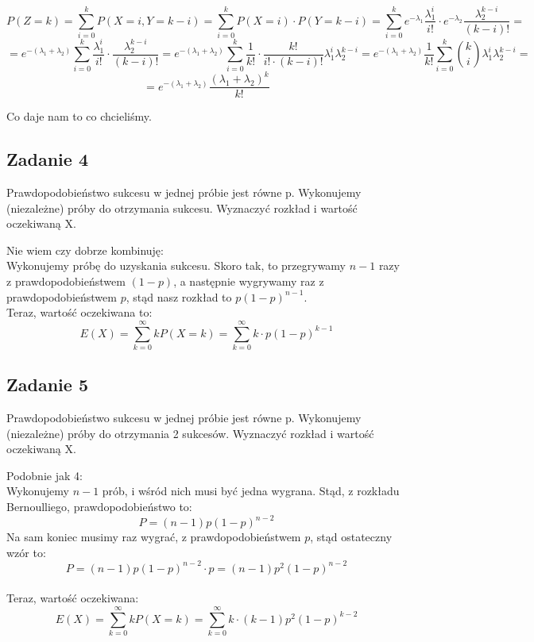 \documentclass[a4paper]{article}
\begin{document}
$$P(Z=k)=\sum_{i=0}^k P(X=i,Y=k-i)= \sum_{i=0}^k P(X=i)\cdot P(Y=k-i)=\sum_{i=0}^k e^{-\lambda_1} \frac {\lambda_1^i}{i!} \cdot e^{-\lambda_2} \frac{\lambda_2^{k-i}}{(k-i)!}=$$ $$= e^{-(\lambda_1+\lambda_2)} \sum_{i=0}^k \frac{\lambda_1^i}{i!} \cdot \frac{\lambda_2^{k-i}}{(k-i)!}=e^{-(\lambda_1+\lambda_2)} \sum_{i=0}^k \frac{1}{k!} \cdot \frac{k!}{i!\cdot(k-i)!} \lambda_1^i\lambda_2^{k-i} = e^{-(\lambda_1+\lambda_2)} \frac{1}{k!} \sum_{i=0}^k {k \choose i}\lambda_1^i\lambda_2^{k-i}=$$ $$= e^{-(\lambda_1+\lambda_2)} \frac{(\lambda_1+\lambda_2)^k}{k!} $$

Co daje nam to co chcieliśmy.

\subsection*{Zadanie 4}
Prawdopodobieństwo sukcesu w jednej próbie jest równe p. Wykonujemy (niezależne) próby do otrzymania sukcesu. Wyznaczyć rozkład i wartość oczekiwaną X.

Nie wiem czy dobrze kombinuję:\\
Wykonujemy próbę do uzyskania sukcesu. Skoro tak, to przegrywamy $n-1$ razy z prawdopodobieństwem $(1-p)$, a następnie wygrywamy raz z prawdopodobieństwem $p$, stąd nasz rozkład to $p(1-p)^{n-1}$.\\
Teraz, wartość oczekiwana to:\\
$$E(X)=\sum\limits_{k=0}^\infty k P(X=k)=\sum\limits_{k=0}^\infty k \cdot p(1-p)^{k-1}$$

\subsection*{Zadanie 5}
Prawdopodobieństwo sukcesu w jednej próbie jest równe p. Wykonujemy (niezależne) próby do otrzymania 2 sukcesów. Wyznaczyć rozkład i wartość oczekiwaną X.

Podobnie jak 4:\\
Wykonujemy $n-1$ prób, i wśród nich musi być jedna wygrana. Stąd, z rozkładu Bernoulliego, prawdopodobieństwo to:\\
$$P=(n-1)p(1-p)^{n-2}$$
Na sam koniec musimy raz wygrać, z prawdopodobieństwem $p$, stąd ostateczny wzór to:\\
$$P=(n-1)p(1-p)^{n-2}\cdot p=(n-1)p^2(1-p)^{n-2}$$\\
Teraz, wartość oczekiwana:\\
$$E(X)=\sum\limits_{k=0}^\infty k P(X=k)=\sum\limits_{k=0}^\infty k \cdot (k-1)p^2(1-p)^{k-2}$$
\end{document}
